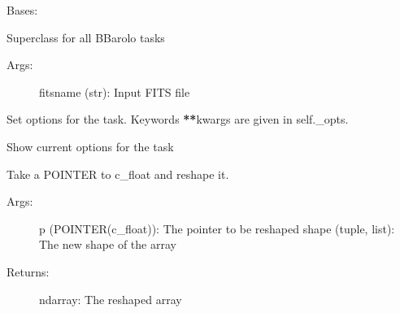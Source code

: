 \documentclass[letterpaper,10pt,english]{sphinxmanual}
\begin{document}
\begin{fulllineitems}
\label{\detokenize{pybb_api:pyBBarolo.pyBBarolo.Task}}
Bases: 

Superclass for all BBarolo tasks
\begin{description}
\item[{Args:}] \leavevmode
fitsname (str): Input FITS file

\end{description}

\begin{fulllineitems}
\label{\detokenize{pybb_api:pyBBarolo.pyBBarolo.Task.set_options}}
Set options for the task. Keywords {\color{red}\bfseries{}**}kwargs are given in self.\_opts.

\end{fulllineitems}


\begin{fulllineitems}
\label{\detokenize{pybb_api:pyBBarolo.pyBBarolo.Task.show_options}}
Show current options for the task

\end{fulllineitems}


\end{fulllineitems}


\begin{fulllineitems}
\label{\detokenize{pybb_api:pyBBarolo.pyBBarolo.reshapePointer}}
Take a POINTER to c\_float and reshape it.
\begin{description}
\item[{Args:}] \leavevmode
p (POINTER(c\_float)): The pointer to be reshaped
shape (tuple, list): The new shape of the array

\item[{Returns:}] \leavevmode
ndarray: The reshaped array

\end{description}

\end{fulllineitems}
\end{document}
